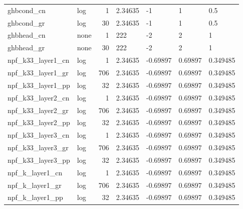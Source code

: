 \documentclass{article}
\begin{document}
\begin{center}
\begin{landscape}
\begin{longtable}{llrllll}
\bottomrule
\endlastfoot
         ghbcond\_cn &       log &      1 &        2.34635 &                  -1 &                  1 &                0.5 \\
         ghbcond\_gr &       log &     30 &        2.34635 &                  -1 &                  1 &                0.5 \\
         ghbhead\_cn &      none &      1 &            222 &                  -2 &                  2 &                  1 \\
         ghbhead\_gr &      none &     30 &            222 &                  -2 &                  2 &                  1 \\
  npf\_k33\_layer1\_cn &       log &      1 &        2.34635 &            -0.69897 &            0.69897 &           0.349485 \\
  npf\_k33\_layer1\_gr &       log &    706 &        2.34635 &            -0.69897 &            0.69897 &           0.349485 \\
  npf\_k33\_layer1\_pp &       log &     32 &        2.34635 &            -0.69897 &            0.69897 &           0.349485 \\
  npf\_k33\_layer2\_cn &       log &      1 &        2.34635 &            -0.69897 &            0.69897 &           0.349485 \\
  npf\_k33\_layer2\_gr &       log &    706 &        2.34635 &            -0.69897 &            0.69897 &           0.349485 \\
  npf\_k33\_layer2\_pp &       log &     32 &        2.34635 &            -0.69897 &            0.69897 &           0.349485 \\
  npf\_k33\_layer3\_cn &       log &      1 &        2.34635 &            -0.69897 &            0.69897 &           0.349485 \\
  npf\_k33\_layer3\_gr &       log &    706 &        2.34635 &            -0.69897 &            0.69897 &           0.349485 \\
  npf\_k33\_layer3\_pp &       log &     32 &        2.34635 &            -0.69897 &            0.69897 &           0.349485 \\
    npf\_k\_layer1\_cn &       log &      1 &        2.34635 &            -0.69897 &            0.69897 &           0.349485 \\
    npf\_k\_layer1\_gr &       log &    706 &        2.34635 &            -0.69897 &            0.69897 &           0.349485 \\
    npf\_k\_layer1\_pp &       log &     32 &        2.34635 &            -0.69897 &            0.69897 &           0.349485 \\

\end{longtable}
\end{landscape}
\end{center}
\end{document}
